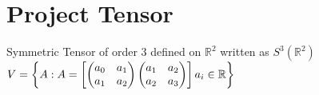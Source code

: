 \documentclass[45pt]{article}
\begin{document}
\section{Project Tensor}
\Large{Symmetric Tensor of order 3 defined on $\mathbb{R}^2$ written as $ S^3(\mathbb{R}^2)$}\\

$V=\begin{Bmatrix}  
  A: A=
 \begin{bmatrix}
  \begin{pmatrix} a_0&a_1\\ a_1&a_2\\
  \end{pmatrix}
  \begin{pmatrix}
  a_1&a_2\\
  a_2& a_3 \\
\end{pmatrix}
  \end{bmatrix}
  a_i \in \mathbb{R}
\end{Bmatrix}\\
$
\newcommand\fontsizeXii{\fontsize{12pt}{12pt}\selectfont}
\end{document}
